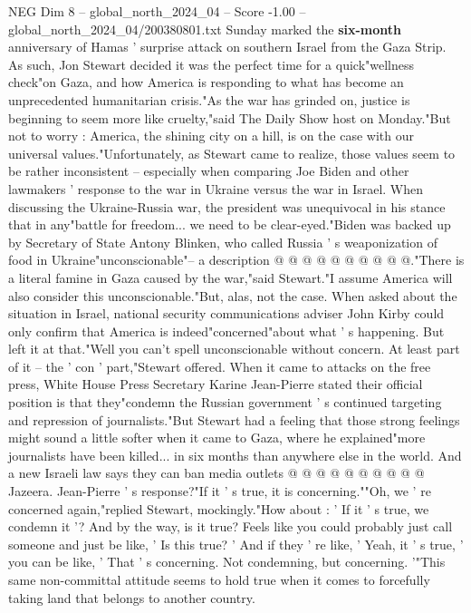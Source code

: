 \begin{textsample}{NEG Dim 8 – global\_north\_2024\_04 – Score -1.00 – global\_north\_2024\_04/200380801.txt}  \label{ex:f8_neg_135}
Sunday marked the \textbf{six-month} anniversary of Hamas ' surprise attack on southern Israel from the Gaza Strip.
As such, Jon Stewart decided it was the perfect time for a quick"wellness check"on Gaza, and how America is responding to what has become an unprecedented humanitarian crisis."As the war has grinded on, justice is beginning to seem more like cruelty,"said The Daily Show host on Monday."But not to worry : America, the shining city on a hill, is on the case with our universal values."Unfortunately, as Stewart came to realize, those values seem to be rather inconsistent -- especially when comparing Joe Biden and other lawmakers ' response to the war in Ukraine versus the war in Israel.
When discussing the Ukraine-Russia war, the president was unequivocal in his stance that in any"battle for freedom... we need to be clear-eyed."Biden was backed up by Secretary of State Antony Blinken, who called Russia ' s weaponization of food in Ukraine"unconscionable"-- a description @ @ @ @ @ @ @ @ @ @."There is a literal famine in Gaza caused by the war,"said Stewart."I assume America will also consider this unconscionable."But, alas, not the case.
When asked about the situation in Israel, national security communications adviser John Kirby could only confirm that America is indeed"concerned"about what ' s happening.
But left it at that."Well you can't spell unconscionable without concern.
At least part of it -- the ' con ' part,"Stewart offered.
When it came to attacks on the free press, White House Press Secretary Karine Jean-Pierre stated their official position is that they"condemn the Russian government ' s continued targeting and repression of journalists."But Stewart had a feeling that those strong feelings might sound a little softer when it came to Gaza, where he explained"more journalists have been killed... in six months than anywhere else in the world.
And a new Israeli law says they can ban media outlets @ @ @ @ @ @ @ @ @ @ Jazeera.
Jean-Pierre ' s response?"If it ' s true, it is concerning.""Oh, we ' re concerned again,"replied Stewart, mockingly."How about : ' If it ' s true, we condemn it '?
And by the way, is it true?
Feels like you could probably just call someone and just be like, ' Is this true? ' And if they ' re like, ' Yeah, it ' s true, ' you can be like, ' That ' s concerning.
Not condemning, but concerning. '"This same non-committal attitude seems to hold true when it comes to forcefully taking land that belongs to another country.

\end{textsample}
